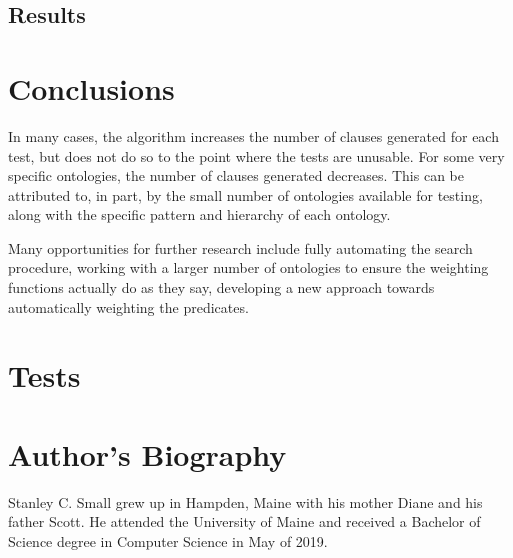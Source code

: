 \documentclass{article}
\begin{document}
		\subsection{Results}
	\newpage
	\section{Conclusions}

In many cases, the algorithm increases the number of clauses generated for each test, but does not do so to the point where the tests are unusable. For some very specific ontologies, the number of clauses generated decreases. This can be attributed to, in part, by the small number of ontologies available for testing, along with the specific pattern and hierarchy of each ontology. 

Many opportunities for further research include fully automating the search procedure, working with a larger number of ontologies to ensure the weighting functions actually do as they say, developing a new approach towards automatically weighting the predicates. 
	\newpage
	\printbibliography

	\newpage
	\appendix

	\section{Tests}

	\newpage
	\section*{Author's Biography}
Stanley C. Small grew up in Hampden, Maine with his mother Diane and his father Scott. He attended the University of Maine and received a Bachelor of Science degree in Computer Science in May of 2019. 
\end{document}
